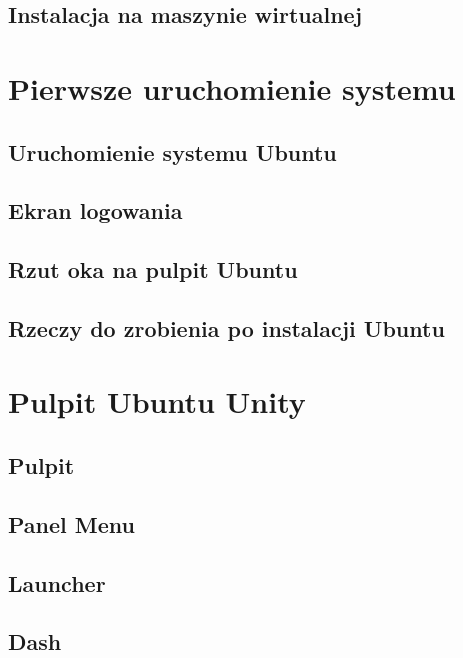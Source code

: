 \documentclass[a4paper,11pt,oneside]{mwart}
\begin{document}
        \subsection{Instalacja na maszynie wirtualnej}
                           
\section{Pierwsze uruchomienie systemu}
        \label{sec:pierwsze_uruchomienie}
        \subsection{Uruchomienie systemu Ubuntu}
                
        \subsection{Ekran logowania}
                
        \subsection{Rzut oka na pulpit Ubuntu}
                
        \subsection{Rzeczy do zrobienia po instalacji Ubuntu}
                \label{sec:rzeczy_do_zrobienia_po_instalacji}
                
\section{Pulpit Ubuntu Unity}
		
        \label{pulpit_unity}
        \subsection{Pulpit}
        		       
        \subsection{Panel Menu}
        		
        \subsection{Launcher}
        		
        \subsection{Dash}
        		
\end{document}
